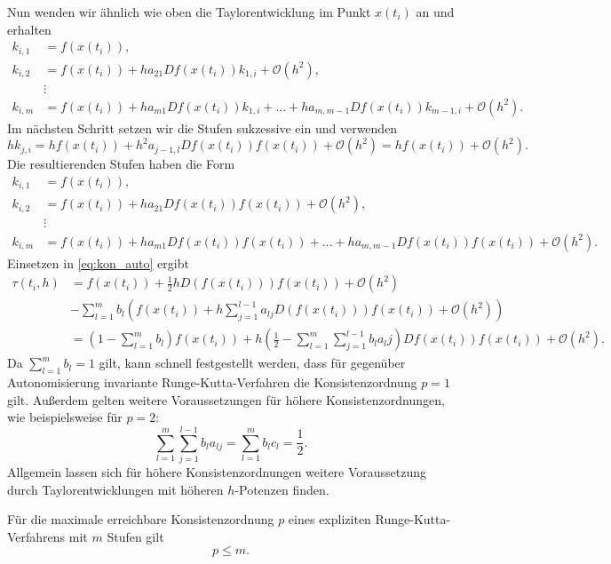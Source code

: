 Nun wenden wir ähnlich wie oben die Taylorentwicklung im Punkt $x(t_i)$ an und erhalten
\begin{align*}
    k_{i,1} &= f(x(t_i)), \\
    k_{i,2} &= f(x(t_i)) + ha_{21}Df(x(t_i))k_{1,i} + \mathcal{O}(h^2), \\
    &\vdots\\
    k_{i,m} &= f(x(t_i)) + ha_{m1}Df(x(t_i))k_{1,i} + \dots + ha_{m,m-1}Df(x(t_i))k_{m-1,i} + \mathcal{O}(h^2).
\end{align*}
Im nächsten Schritt setzen wir die Stufen sukzessive ein und verwenden
\[
    h k_{j,i} = hf(x(t_i)) + h^2 a_{j-1,l}Df(x(t_i))f(x(t_i)) + \mathcal{O}(h^2) = hf(x(t_i)) + \mathcal{O}(h^2).
\]
Die resultierenden Stufen haben die Form
\begin{align*}
    k_{i,1} &= f(x(t_i)), \\
    k_{i,2} &= f(x(t_i)) + ha_{21}Df(x(t_i))f(x(t_i)) + \mathcal{O}(h^2), \\
    &\vdots\\
    k_{i,m} &= f(x(t_i)) + ha_{m1}Df(x(t_i))f(x(t_i)) + \dots + ha_{m,m-1}Df(x(t_i))f(x(t_i)) + \mathcal{O}(h^2).
\end{align*}
Einsetzen in \eqref{eq:kon_auto} ergibt
\begin{align*}
    \tau(t_i,h) &= f(x(t_i)) + \frac{1}{2}hD(f(x(t_i)))f(x(t_i)) + \mathcal{O}(h^2) \\
    &- \sum_{l=1}^{m} b_l \left( f(x(t_i)) + h \sum_{j=1}^{l-1} a_{lj} D(f(x(t_i)))f(x(t_i)) + \mathcal{O}(h^2)\right)\\
    &= \left( 1 - \sum_{l=1}^{m} b_l  \right)f(x(t_i))
    + h \left( \frac{1}{2} - \sum_{l=1}^{m} \sum_{j=1}^{l-1} b_l a_lj \right) Df(x(t_i))f(x(t_i)) + \mathcal{O}(h^2).
\end{align*}
Da $\sum\limits_{l=1}^{m}b_l =1$ gilt, kann schnell festgestellt werden, dass für gegenüber Autonomisierung invariante
Runge-Kutta-Verfahren die Konsistenzordnung $p=1$ gilt. Außerdem gelten weitere Voraussetzungen für höhere
Konsistenzordnungen, wie beispielsweise für $p=2$:
\[
    \sum_{l=1}^{m} \sum_{j=1}^{l-1} b_l a_{lj} = \sum_{l=1}^{m} b_l c_l = \frac{1}{2}.
\]
Allgemein lassen sich für höhere Konsistenzordnungen weitere Voraussetzung durch Taylorentwicklungen mit höheren
$h$-Potenzen finden.
\begin{satz}[Butcherschranken]
    Für die maximale erreichbare Konsistenzordnung $p$ eines expliziten Runge-Kutta-Verfahrens mit $m$ Stufen gilt
    \[
        p \leq m.
    \]
\end{satz}

